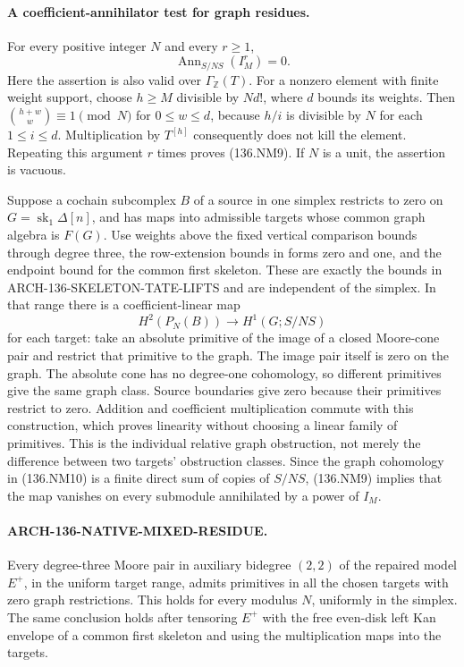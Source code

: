 \paragraph{A coefficient-annihilator test for graph residues.}
For every positive integer \(N\) and every \(r\geq1\),
\[
                 \operatorname{Ann}_{S/NS}(I_M^r)=0.
                                                               \tag{136.NM9}
\]
Here the assertion is also valid over \(\Gamma_{\mathbb Z}(T)\).
For a nonzero element with finite weight support, choose
\(h\geq M\) divisible by \(N d!\), where \(d\) bounds
its weights. Then
\(\binom{h+w}{w}\equiv1\pmod N\) for \(0\leq w\leq d\),
because \(h/i\) is divisible by \(N\) for each \(1\leq i\leq d\).
Multiplication by \(T^{[h]}\) consequently does not kill
the element. Repeating this argument \(r\) times proves
(136.NM9). If \(N\) is a unit, the assertion is vacuous.

Suppose a cochain subcomplex \(B\) of a source in one simplex
restricts to zero on \(G=\operatorname{sk}_1\Delta[n]\),
and has maps into admissible targets whose common graph algebra
is \(F(G)\). Use weights above the fixed vertical comparison
bounds through degree three, the row-extension bounds in forms
zero and one, and the endpoint bound for the common first skeleton.
These are exactly the bounds in ARCH-136-SKELETON-TATE-LIFTS
and are independent of the simplex. In that range there is
a coefficient-linear map
\[
 H^2(P_N(B))\longrightarrow H^1(G;S/NS)                 \tag{136.NM10}
\]
for each target: take an absolute primitive of the image of a
closed Moore-cone pair and restrict that primitive to the graph.
The image pair itself is zero on the graph. The absolute cone
has no degree-one cohomology, so different primitives give the
same graph class. Source boundaries give zero because their
primitives restrict to zero. Addition and coefficient
multiplication commute with this construction, which proves
linearity without choosing a linear family of primitives.
This is the individual relative graph obstruction, not merely
the difference between two targets' obstruction classes.
Since the graph cohomology in (136.NM10) is a finite direct
sum of copies of \(S/NS\), (136.NM9) implies that the map
vanishes on every submodule annihilated by a power of \(I_M\).

\paragraph{ARCH-136-NATIVE-MIXED-RESIDUE.}
Every degree-three Moore pair in auxiliary bidegree \((2,2)\)
of the repaired model \(E^+\), in the uniform target range,
admits primitives in all the chosen targets with zero graph
restrictions. This holds for every modulus \(N\), uniformly
in the simplex. The same conclusion holds after tensoring
\(E^+\) with the free even-disk left Kan envelope of a
common first skeleton and using the multiplication maps into
the targets.

